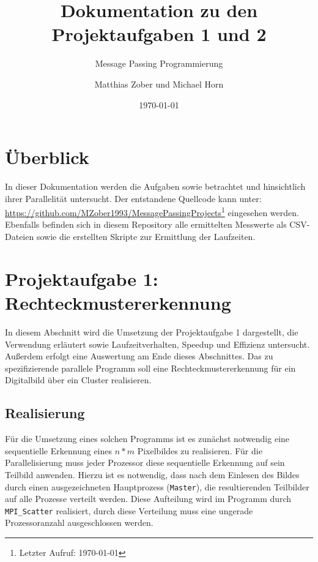 	
					
\title{Dokumentation zu den Projektaufgaben 1 und 2}
\subtitle{Message Passing Programmierung}

\author{Matthias Zober und Michael Horn\vspace{5cm}}
\date{\today}


\maketitle
\tableofcontents
\thispagestyle{empty}
\pagebreak
\setcounter{page}{1}

\section{Überblick}
In dieser Dokumentation werden die Aufgaben  sowie  betrachtet und hinsichtlich ihrer Parallelität untersucht.
Der entstandene Quellcode kann unter:\\
\url{https://github.com/MZober1993/MessagePassingProjects}\footnote{Letzter Aufruf: \today}
eingesehen werden.\\
Ebenfalls befinden sich in diesem Repository alle ermittelten Messwerte als CSV-Dateien sowie die erstellten Skripte zur Ermittlung der Laufzeiten.

\section{Projektaufgabe 1: Rechteckmustererkennung}
In diesem Abschnitt wird die Umsetzung der Projektaufgabe 1 dargestellt, die Verwendung erläutert sowie Laufzeitverhalten, Speedup und Effizienz untersucht. 
Außerdem erfolgt eine Auswertung am Ende dieses Abschnittes.
Das zu spezifizierende parallele Programm soll eine Rechteckmustererkennung für ein Digitalbild über ein Cluster realisieren.

\subsection{Realisierung}
\label{ref:realisierungRect}
Für die Umsetzung eines solchen Programms ist es zunächst notwendig eine sequentielle Erkennung eines $n*m$ Pixelbildes zu realisieren.
Für die Parallelisierung muss jeder Prozessor diese sequentielle Erkennung auf sein Teilbild anwenden. Hierzu ist es notwendig, dass nach dem Einlesen des Bildes durch 
einen ausgezeichneten Hauptprozess (\texttt{Master}), die resultierenden Teilbilder auf alle Prozesse verteilt werden. 
Diese Aufteilung wird im Programm durch \texttt{MPI\_Scatter} realisiert, durch diese Verteilung muss eine ungerade Prozessoranzahl ausgeschlossen werden.

